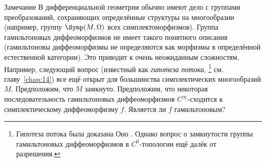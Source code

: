 \begin{ex}{Замечание}\label{1.4.F}
В дифференциальной геометрии обычно имеют дело с группами
преобразований, сохраняющих определённые структуры на многообразии
(например, группу $\Symp(M,\Omega)$ всех симплектоморфизмов).
Группа гамильтоновых диффеоморфизмов не имеет такого понятного
описания (гамильтоновы диффеоморфизмы не определяются как морфизмы в
определённой естественной категории).
Это приводит к очень неожиданным сложностям. 
Например, следующий вопрос (известный как \emph{гипотеза потока},%
\footnote{
Гипотеза потока была доказана Оно \cite{O06}. Однако вопрос о
замкнутости группы гамильтоновых диффеоморфизмов в $C^{0}$-топологии
ещё далёк от разрешения.\dpp}
см. главу~\ref{chap:14}) все ещё
открыт для большинства симплектических многообразий $M$.
Предположим, что $M$ замкнуто.
Предположим, что некоторая последовательность гамильтоновых
диффеоморфизмов $C^\infty$-сходится к симплектическому диффеоморфизму
$f$.
Является ли $f$ гамильтоновым?
\end{ex}

